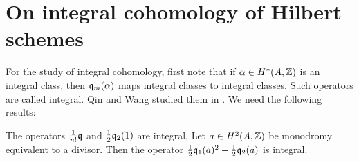\section{On integral cohomology of Hilbert schemes}

For the study of integral cohomology, first note that if $\alpha \in H^*(A,\mathbb{Z})$ is an integral class, then $\mathfrak{q}_{m}(\alpha) $ maps integral classes to integral classes. Such operators are called integral. Qin and Wang studied them in \cite{QinWang}. We need the following results:

\begin{lemma} \cite{QinWang}\label{IntegralOperators}
The operators $\frac{1}{n!}\mathfrak{q}$ and $\frac{1}{2}\mathfrak{q}_2(1) $ are integral.
Let $a\in H^2(A,\mathbb{Z})$ be monodromy equivalent to a divisor. Then the operator $\frac{1}{2}\mathfrak{q}_1(a)^2 - \frac{1}{2}\mathfrak{q}_2(a)$ is integral. 
\end{lemma}


